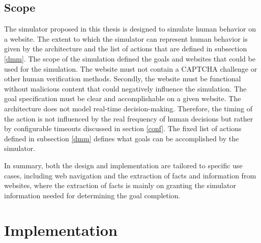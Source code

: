 


\section{Scope}

The simulator proposed in this thesis is designed to simulate human behavior on a website. The extent to which the simulator can represent human behavior is given by the architecture and the list of actions that are defined in subsection \ref{dmm}. The scope of the simulation defined the goals and websites that could be used for the simulation. The website must not contain a CAPTCHA challenge or other human verification methods. Secondly, the website must be functional without malicious content that could negatively influence the simulation. The goal specification must be clear and accomplishable on a given website. The architecture does not model real-time decision-making. Therefore, the timing of the action is not influenced by the real frequency of human decisions but rather by configurable timeouts discussed in section \ref{conf}. The fixed list of actions defined in subsection \ref{dmm} defines what goals can be accomplished by the simulator.

In summary, both the design and implementation are tailored to specific use cases, including web navigation and the extraction of facts and information from websites, where the extraction of facts is mainly on granting the simulator information needed for determining the goal completion.

\chapter{Implementation}
\label{imp}


